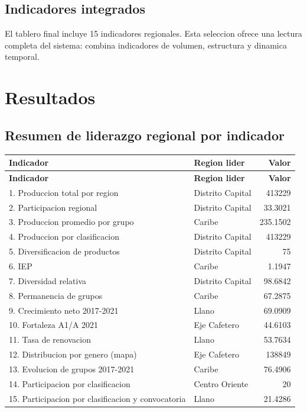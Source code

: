 \documentclass[12pt,letterpaper]{article}
\begin{document}
\subsection{Indicadores integrados}

El tablero final incluye 15 indicadores regionales. Esta seleccion ofrece una lectura completa del sistema: combina indicadores de volumen, estructura y dinamica temporal.

\section{Resultados}

\subsection{Resumen de liderazgo regional por indicador}

\begin{longtable}{p{7.8cm}p{3.5cm}r}
\toprule
\textbf{Indicador} & \textbf{Region lider} & \textbf{Valor} \\
\midrule
\endfirsthead
\toprule
\textbf{Indicador} & \textbf{Region lider} & \textbf{Valor} \\
\midrule
\endhead
1. Produccion total por region & Distrito Capital & 413229 \\
2. Participacion regional & Distrito Capital & 33.3021 \\
3. Produccion promedio por grupo & Caribe & 235.1502 \\
4. Produccion por clasificacion & Distrito Capital & 413229 \\
5. Diversificacion de productos & Distrito Capital & 75 \\
6. IEP & Caribe & 1.1947 \\
7. Diversidad relativa & Distrito Capital & 98.6842 \\
8. Permanencia de grupos & Caribe & 67.2875 \\
9. Crecimiento neto 2017-2021 & Llano & 69.0909 \\
10. Fortaleza A1/A 2021 & Eje Cafetero & 44.6103 \\
11. Tasa de renovacion & Llano & 53.7634 \\
12. Distribucion por genero (mapa) & Eje Cafetero & 138849 \\
13. Evolucion de grupos 2017-2021 & Caribe & 76.4906 \\
14. Participacion por clasificacion & Centro Oriente & 20 \\
15. Participacion por clasificacion y convocatoria & Llano & 21.4286 \\
\bottomrule
\end{longtable}
\end{document}
